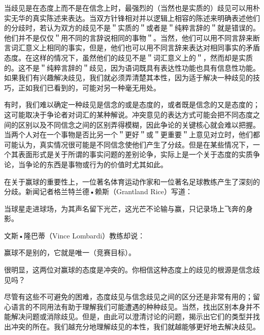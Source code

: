 当歧见是在态度上而不是在信念上时，最强烈的（当然也是实质的）歧见可以用朴实无华的真实陈述来表达。当双方针锋相对并以逻辑上相容的陈述来明确表述他们的分歧时，若认为双方的歧见不是＂实质的＂或者是＂纯粹言辞的＂就是错误的。他们并不是仅仅＂用不同的言辞说相同的事物＂。当然，他们可以用不同言辞来断言词汇意义上相同的事实，但是，他们也可以用不同言辞来表达对相同事实的矛盾态度。在这样的情况下，虽然他们的歧见不是＂词汇意义上的＂，然而却是实质的。这不是＂纯粹言辞的＂歧见，因为语词既具有表达性功能也具有信息性功能。如果我们有兴趣解决歧见，我们就必须弄清楚其本性，因为适于解决一种歧见的技巧，正如我们已看到的，可能对另一种毫无用处。

有时，我们难以确定一种歧见是信念的或是态度的，或者既是信念的又是态度的；这可能取决于争论者对词汇的某种解说。冲突意见的表达方式可能会把不同态度之间的区别以及不同信念之间的区别弄得模糊，因此争论的关键核心就会难以把握。当两个人对在一个事物是否比另一个＂更好＂或＂更重要＂上意见对立时，他们都可能认为，真实情况很可能是不同信念使他们产生了分歧。但是在某些情况下，一个其表面形式是关于所谓的事实问题的差别论争，实际上是一个关于态度的实质争论，当争论的东西是事物或行为的价值时尤其如此。

在关于赢球的重要性上，一位著名体育运动作家和一位著名足球教练产生了深刻的分歧。新闻记者格兰特兰德•赖斯（Grantland Rice）写道：

\begin{displayquote}
当球星走进球场，为其声名留下光芒，这光芒不论输与赢，只记录场上飞奔的身影。
\end{displayquote}

文斯•隆巴蒂（Vince Lombardi）教练却说：

\begin{displayquote}
赢球不是别的，它就是唯一（竞赛目标）。
\end{displayquote}

很明显，这两位对赢球的态度是冲突的。你相信这种态度上的歧见的根源是信念歧见吗？

尽管有这些不可避免的困难，态度歧见与信念歧见之间的区分还是非常有用的；留心语言的不同用法有助于理解我们可能遭遇的种种歧见。当然，找出区别本身并不能解决问题或消除歧见。但是，由此可以澄清讨论的问题，揭示出它们的类型并找出冲突的所在。我们越充分地理解歧见的本性，我们就越能够更好地去解决歧见。

